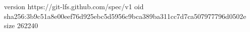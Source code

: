 version https://git-lfs.github.com/spec/v1
oid sha256:3b9c51a8e00eef76d925ebc5d5956c9bca389ba311cc7d7ca507977796d0502e
size 262240
